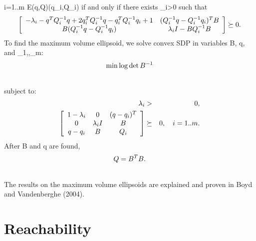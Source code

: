 \documentclass[letterpaper,10pt,english]{sphinxmanual}
\begin{document}
i=1..m {\mathcal E}(q,Q)(q_i,Q_i)
if and only if there exists \lambda_i>0 such that
\begin{gather}
\begin{split}\left[\begin{array}{cc}
-\lambda_i - q^TQ_i^{-1}q + 2q_i^TQ_i^{-1}q - q_i^TQ_i^{-1}q_i + 1 & (Q_i^{-1}q-Q_i^{-1}q_i)^TB\\
B(Q_i^{-1}q-Q_i^{-1}q_i) & \lambda_iI-BQ_i^{-1}B\end{array}\right] \succeq 0.\end{split}\notag
\end{gather}
To find the maximum volume ellipsoid, we solve convex SDP in variables
B, q, and \lambda_1,\cdots,\lambda_m:
\begin{gather}
\begin{split}\min \log \det B^{-1}\end{split}\notag\\\begin{split}\end{split}\notag
\end{gather}
subject to:
\begin{gather}
\begin{split}\begin{aligned}
\lambda_i & > & 0, \\
\left[\begin{array}{ccc}
1-\lambda_i & 0 & (q - q_i)^T\\
0 & \lambda_iI & B\\
q - q_i & B & Q_i\end{array}\right] & \succeq & 0, ~~~ i=1..m.\end{aligned}\end{split}\notag
\end{gather}
After B and q are found,
\begin{gather}
\begin{split}Q = B^TB.\end{split}\notag\\\begin{split}\end{split}\notag
\end{gather}
The results on the maximum volume ellipsoids are explained and proven in
Boyd and Vandenberghe (2004).


\chapter{Reachability}
\label{chap_reach:reachability}\label{chap_reach::doc}
\end{document}
